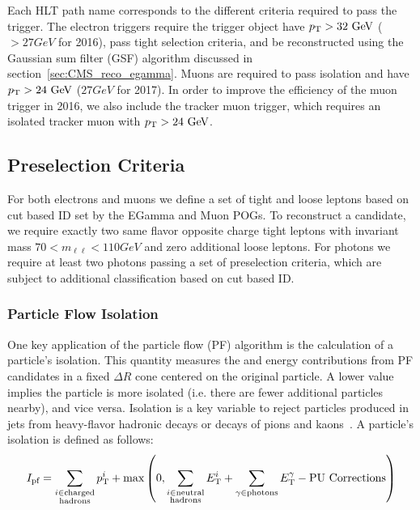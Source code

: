 Each HLT path name corresponds to the different criteria required to pass the trigger. The electron triggers require the trigger object have $\pt>32\unit{GeV}$ ($>27\unit{GeV}$ for 2016), pass tight selection criteria, and be reconstructed using the Gaussian sum filter (GSF) algorithm discussed in section~\ref{sec:CMS_reco_egamma}. Muons are required to pass isolation and have $\pt>24\unit{GeV}$ ($27\unit{GeV}$ for 2017). In order to improve the efficiency of the muon trigger in 2016, we also include the tracker muon trigger, which requires an isolated tracker muon with $\pt>24\unit{GeV}$.

\subsection{Preselection Criteria} \label{sec:ana_preselection}
For both electrons and muons we define a set of tight and loose leptons based on cut based ID set by the EGamma and Muon POGs. To reconstruct a \VZ candidate, we require exactly two same flavor opposite charge tight leptons with invariant mass $70<m_{\ell\ell}<110\unit{GeV}$ and zero additional loose leptons. For photons we require at least two photons passing a set of preselection criteria, which are subject to additional classification based on cut based ID.

\subsubsection{Particle Flow Isolation} \label{sec:ana_isolation}
One key application of the particle flow (PF) algorithm is the calculation of a particle's isolation. This quantity measures the \pt and energy contributions from PF candidates in a fixed $\Delta R$ cone centered on the original particle. A lower value implies the particle is more isolated (i.e. there are fewer additional particles nearby), and vice versa. Isolation is a key variable to reject particles produced in jets from heavy-flavor hadronic decays or decays of pions and kaons~\cite{Sirunyan:PF}. A particle's isolation is defined as follows:
\begin{equation}
	\label{eq:pfiso}
	I_\text{pf} = \sum_{\substack{i\in\text{charged}\\\text{hadrons}}}\pt^i+\text{max}\left(0,\sum_{\substack{i\in\text{neutral}\\\text{hadrons}}}\et^i+\sum_{\gamma\in\text{photons}}\et^\gamma-\text{PU Corrections}\right)
\end{equation}


